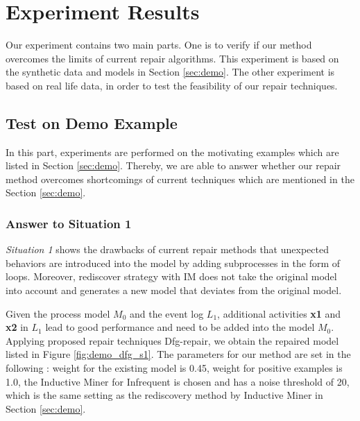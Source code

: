 \section{Experiment Results}
Our experiment contains two main parts. One is to verify if our method overcomes the limits of current repair algorithms. This experiment is based on the synthetic data and models in Section \ref{sec:demo}. The other experiment is based on real life data, in order to test the feasibility of our repair techniques.
 
\subsection{Test on Demo Example}
In this part, experiments are performed on the motivating examples which are listed in Section \ref{sec:demo}. Thereby, we are able to answer whether our repair method overcomes shortcomings of current techniques which are mentioned in the Section \ref{sec:demo}. 
\subsubsection{Answer to Situation 1}
\emph{Situation 1} shows the drawbacks of current repair methods \cite{fahland2015model} that unexpected behaviors are introduced into the model by adding subprocesses in the form of loops. Moreover, rediscover strategy with IM does not take the original model into account and generates a new model that deviates from the original model. 


Given the process model $M_0$ and the event log $L_1$, additional activities \textbf{x1} and \textbf{x2} in $L_1$ lead to good performance and need to be added into the model $M_0$. Applying proposed repair techniques Dfg-repair, we obtain the  repaired model listed in Figure \ref{fig:demo_dfg_s1}. The parameters for our method are set in the following : weight for the existing model is 0.45, weight for positive examples is 1.0, the Inductive Miner for Infrequent is chosen and has a noise threshold of 20, which is the same setting as the rediscovery method by Inductive Miner in Section \ref{sec:demo}. 

